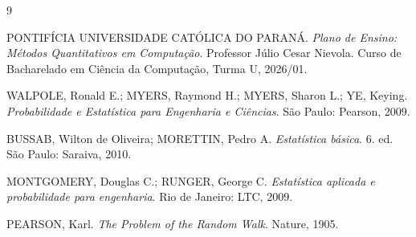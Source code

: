 \documentclass[12pt,a4paper]{article}
\begin{document}
\begin{thebibliography}{9}

PONTIFÍCIA UNIVERSIDADE CATÓLICA DO PARANÁ. \textit{Plano de Ensino: Métodos Quantitativos em Computação}. Professor Júlio Cesar Nievola. Curso de Bacharelado em Ciência da Computação, Turma U, 2026/01.

WALPOLE, Ronald E.; MYERS, Raymond H.; MYERS, Sharon L.; YE, Keying. \textit{Probabilidade e Estatística para Engenharia e Ciências}. São Paulo: Pearson, 2009.

BUSSAB, Wilton de Oliveira; MORETTIN, Pedro A. \textit{Estatística básica}. 6. ed. São Paulo: Saraiva, 2010.

MONTGOMERY, Douglas C.; RUNGER, George C. \textit{Estatística aplicada e probabilidade para engenharia}. Rio de Janeiro: LTC, 2009.

PEARSON, Karl. \textit{The Problem of the Random Walk}. Nature, 1905.

\end{thebibliography}
\end{document}
